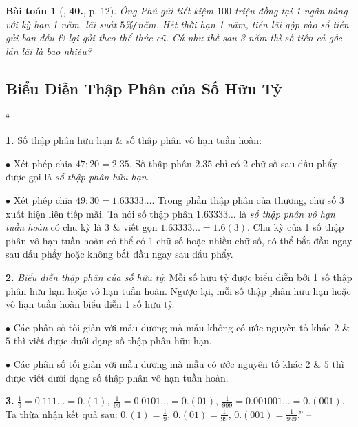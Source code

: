 \documentclass{article}
\numberwithin{equation}{section}
\newtheorem{baitoan}{Bài toán}[section]
\begin{document}
\begin{baitoan}[\cite{Tuyen_Toan_7}, \textbf{40.}, p. 12]
	Ông Phú gửi tiết kiệm $100$ triệu đồng tại 1 ngân hàng với kỳ hạn 1 năm, lãi suất $5$\%\emph{\texttt{/}}năm. Hết thời hạn 1 năm, tiền lãi gộp vào sổ tiền gửi ban đầu \& lại gửi theo thể thức cũ. Cứ như thế sau 3 năm thì số tiền cả gốc lẫn lãi là bao nhiêu?
\end{baitoan}


\subsection{Biểu Diễn Thập Phân của Số Hữu Tỷ}
``\begin{enumerate*}
	\item[\textbf{1.}] Số thập phân hữu hạn \& số thập phân vô hạn tuần hoàn:
	\begin{enumerate*}
		\item[$\bullet$] Xét phép chia $47:20 = 2.35$. Số thập phân $2.35$ chỉ có 2 chữ số sau dấu phẩy được gọi là \textit{số thập phân hữu hạn}.
		\item[$\bullet$] Xét phép chia $49:30 = 1.63333\ldots$. Trong phần thập phân của thương, chữ số $3$ xuất hiện liên tiếp mãi. Ta nói số thập phân $1.63333\ldots$ là \textit{số thập phân vô hạn tuần hoàn} có chu kỳ là $3$ \& viết gọn $1.63333\ldots = 1.6(3)$. Chu kỳ của 1 số thập phân vô hạn tuần hoàn có thể có 1 chữ số hoặc nhiều chữ số, có thể bắt đầu ngay sau dấu phẩy hoặc không bắt đầu ngay sau dấu phẩy.
	\end{enumerate*}
	\item[\textbf{2.}] \textit{Biểu diễn thập phân của số hữu tỷ}: Mỗi số hữu tỷ được biểu diễn bởi 1 số thập phân hữu hạn hoặc vô hạn tuần hoàn. Ngược lại, mỗi số thập phân hữu hạn hoặc vô hạn tuần hoàn biểu diễn 1 số hữu tỷ.
	\begin{enumerate*}
		\item[$\bullet$] Các phân số tối giản với mẫu dương mà mẫu không có ước nguyên tố khác $2$ \& $5$ thì viết được dưới dạng số thập phân hữu hạn.
		\item[$\bullet$] Các phân số tối giản với mẫu dương mà mẫu có ước nguyên tố khác $2$ \& $5$ thì được viết dưới dạng số thập phân vô hạn tuần hoàn.
	\end{enumerate*}
	\item[\textbf{3.}] $\frac{1}{9} = 0.111\ldots = 0.(1)$, $\frac{1}{99} = 0.0101\ldots = 0.(01)$, $\frac{1}{999} = 0.001001\ldots = 0.(001)$. Ta thừa nhận kết quả sau: $0.(1) = \frac{1}{9}$, $0.(01) = \frac{1}{99}$, $0.(001) = \frac{1}{999}$.'' -- \cite[\S5, pp. 12--13]{Tuyen_Toan_7}
\end{enumerate*}
\end{document}

